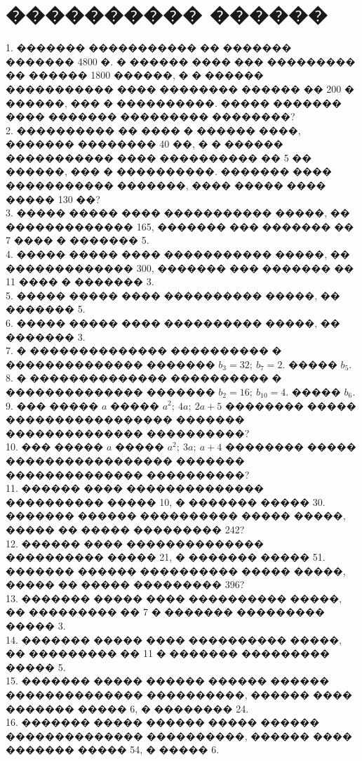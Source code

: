 \documentclass[12pt]{article}
\begin{document}
\section{���������� ������}
1. ������� ����������� �� ������� ������� 4800 �. � ������ ���� ��� ��������� �� ������ 1800 ������, � � ������ ����������� ���� �������� ������ �� 200 � ������, ��� � ����������. ����� ������� ���� ������� ��������� ��������?\\
2. ���������� �� ���� � ������ ����, ������� �������� 40 ��, � � ������ ����������� ���� ���������� �� 5 �� ������, ��� � ����������. ������� ���� ����������� �������, ���� ����� ���� ����� 130 ��?\\
3. ����� ����� ���� ����������� �����, �� ������������� 165, ������� ��� ������� �� 7 ���� � ������� 5.\\
4. ����� ����� ���� ����������� �����, �� ������������� 300, ������� ��� ������� �� 11 ���� � ������� 3.\\
5. ����� ����� ���� ���������� �����, �� ������� 5.\\
6. ����� ����� ���� ���������� �����, �� ������� 3.\\
7. � �������������� ���������� � �������������� ������� $b_3=32;\ b_7=2.$ ����� $b_5.$\\
8. � �������������� ���������� � �������������� ������� $b_2=16;\ b_{10}=4.$ ����� $b_6.$\\
9. ��� ����� $a$ ����� $a^2;\ 4a;\ 2a+5$ �������� ����� ����������������� ������� �������������� ����������?\\
10. ��� ����� $a$ ����� $a^2;\ 3a;\ a+4$ �������� ����� ����������������� ������� �������������� ����������?\\
11. ������ ���� �������������� ���������� ����� 10, � ������� ����� 30. ������� ������ ���������� ����� �����, ����� �� ����� ��������� 242?\\
12. ������ ���� �������������� ���������� ����� 21, � ������� ����� 51. ������� ������ ���������� ����� �����, ����� �� ����� ��������� 396?\\
13. ������� ����� ���� ���������� �����, �� ��������� �� 7 � ������� ��������� ����� 3.\\
14. ������� ����� ���� ���������� �����, �� ��������� �� 11 � ������� ��������� ����� 5.\\
15. ������� ����� ������ ������ ������ �������������� ����������, ������ ���� ������� ����� 6, � �������� 24.\\
16. ������� ����� ������ ����� ������ �������������� ����������, ������ ���� ������� ����� 54, � ����� 6.\\
\end{document}
